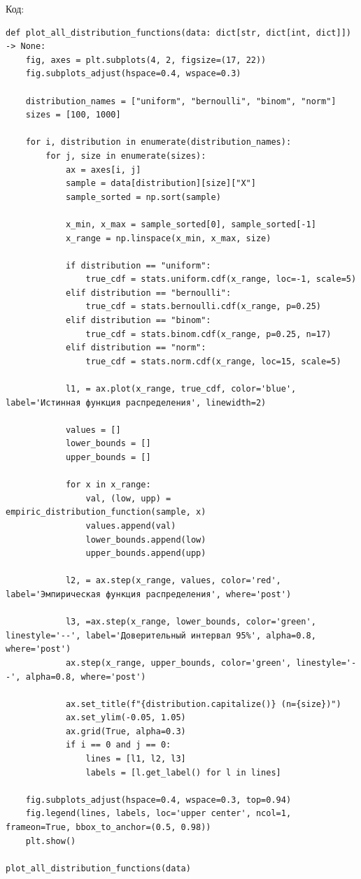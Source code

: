 \documentclass[a4paper,14pt]{extarticle}
\begin{document}
    Код:
    \begin{verbatim}
def plot_all_distribution_functions(data: dict[str, dict[int, dict]]) -> None:
    fig, axes = plt.subplots(4, 2, figsize=(17, 22))
    fig.subplots_adjust(hspace=0.4, wspace=0.3)
    
    distribution_names = ["uniform", "bernoulli", "binom", "norm"]
    sizes = [100, 1000]
    
    for i, distribution in enumerate(distribution_names):
        for j, size in enumerate(sizes):
            ax = axes[i, j]
            sample = data[distribution][size]["X"]
            sample_sorted = np.sort(sample)
            
            x_min, x_max = sample_sorted[0], sample_sorted[-1]
            x_range = np.linspace(x_min, x_max, size)
            
            if distribution == "uniform":
                true_cdf = stats.uniform.cdf(x_range, loc=-1, scale=5)
            elif distribution == "bernoulli":
                true_cdf = stats.bernoulli.cdf(x_range, p=0.25)
            elif distribution == "binom":
                true_cdf = stats.binom.cdf(x_range, p=0.25, n=17)
            elif distribution == "norm":
                true_cdf = stats.norm.cdf(x_range, loc=15, scale=5)
            
            l1, = ax.plot(x_range, true_cdf, color='blue', label='Истинная функция распределения', linewidth=2)
            
            values = []
            lower_bounds = []
            upper_bounds = []
            
            for x in x_range:
                val, (low, upp) = empiric_distribution_function(sample, x)
                values.append(val)
                lower_bounds.append(low)
                upper_bounds.append(upp)
            
            l2, = ax.step(x_range, values, color='red', label='Эмпирическая функция распределения', where='post')
            
            l3, =ax.step(x_range, lower_bounds, color='green', linestyle='--', label='Доверительный интервал 95%', alpha=0.8, where='post')
            ax.step(x_range, upper_bounds, color='green', linestyle='--', alpha=0.8, where='post')
            
            ax.set_title(f"{distribution.capitalize()} (n={size})")
            ax.set_ylim(-0.05, 1.05)
            ax.grid(True, alpha=0.3)
            if i == 0 and j == 0:
                lines = [l1, l2, l3]
                labels = [l.get_label() for l in lines]

    fig.subplots_adjust(hspace=0.4, wspace=0.3, top=0.94)
    fig.legend(lines, labels, loc='upper center', ncol=1, frameon=True, bbox_to_anchor=(0.5, 0.98))
    plt.show()

plot_all_distribution_functions(data)
    \end{verbatim}
\end{document}
